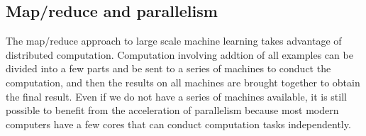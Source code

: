 \subsection{Map/reduce and parallelism}
The map/reduce approach to large scale machine learning takes advantage of distributed computation. Computation involving addtion of all examples can be divided into a few parts and be sent to a series of machines to conduct the computation, and then the results on all machines are brought together to obtain the final result. Even if we do not have a series of machines available, it is still possible to benefit from the acceleration of parallelism because most modern computers have a few cores that can conduct computation tasks independently.
\ifx\PREAMBLE\undefined

\fi